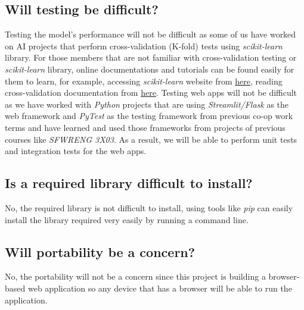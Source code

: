 \documentclass{article}
\begin{document}
    \subsection*{Will testing be difficult?}
    Testing the model's performance will not be difficult as some of us have worked on AI projects that perform cross-validation (K-fold) tests using \textit{scikit-learn} library. For those members that are not familiar with cross-validation testing or \textit{scikit-learn} library, online documentations and tutorials can be found easily for them to learn, for example, accessing \textit{scikit-learn} website from \href{https://scikit-learn.org/stable/index.html}{here}, reading cross-validation documentation from \href{https://scikit-learn.org/stable/modules/cross_validation.html}{here}.
    Testing web apps will not be difficult as we have worked with \textit{Python} projects that are using \textit{Streamlit/Flask} as the web framework and \textit{PyTest} as the testing framework from previous co-op work terms and have learned and used those frameworks from projects of previous courses like \textit{SFWRENG 3X03}. As a result, we will be able to perform unit tests and integration tests for the web apps. 
    \subsection*{Is a required library difficult to install?}
    No, the required library is not difficult to install, using tools like \textit{pip} can easily install the library required very easily by running a command line.
    \subsection*{Will portability be a concern?}
    No, the portability will not be a concern since this project is building a browser-based web application so any device that has a browser will be able to run the application.
\end{document}
